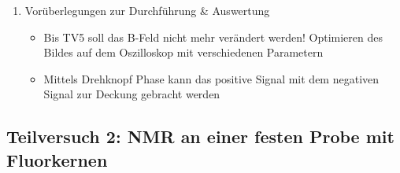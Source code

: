 \documentclass{article}
\begin{document}
\begin{enumerate}[label = (\Roman*)]
    \item Vorüberlegungen zur Durchführung \& Auswertung
        \begin{itemize}
            \item Bis TV5 soll das B-Feld nicht mehr verändert werden! Optimieren des Bildes auf dem Oszilloskop mit verschiedenen Parametern
            \item Mittels Drehknopf Phase kann das positive Signal mit dem negativen Signal zur Deckung gebracht werden
        \end{itemize}
\end{enumerate}

\newpage

\subsection{Teilversuch 2: NMR an einer festen Probe mit Fluorkernen}
\end{document}

